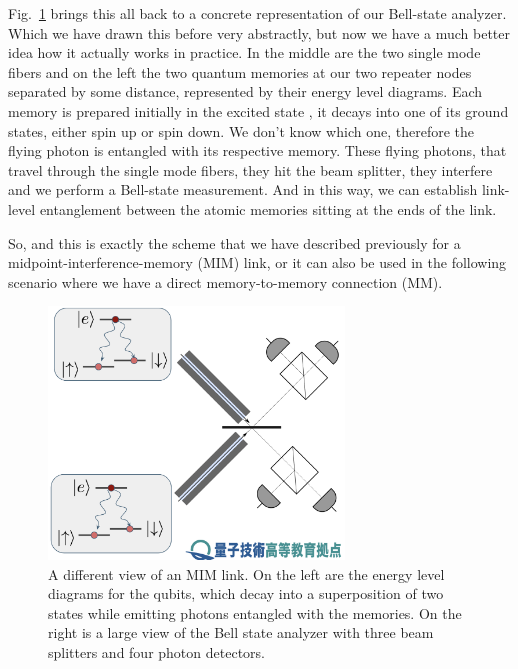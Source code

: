 Fig.~\ref{fig:13-MIM-energy} brings this all back to a concrete representation of our Bell-state analyzer. Which we have drawn this before very abstractly, but now we have a much better idea how it actually works in practice. In the middle are the two single mode fibers and on the left the two quantum memories at our two repeater nodes separated by some distance, represented by their energy level diagrams. Each memory is prepared initially in the excited state , it decays into one of its ground states, either spin up or spin down. We don't know which one, therefore the flying photon is entangled with its respective memory. These flying photons, that travel through the single mode fibers, they hit the beam splitter, they interfere and we perform a Bell-state measurement. And in this way, we can establish link-level entanglement between the atomic memories sitting at the ends of the link.

So, and this is exactly the scheme that we have described previously for a midpoint-interference-memory (MIM) link, or it can also be used in the following scenario where we have a direct memory-to-memory connection (MM).

\begin{figure}[t]
    \centering
    \includegraphics[width=0.7\textwidth]{lesson13/MIM-with-energy-levels.png}
    \caption[MIM with energy levels]{A different view of an MIM link. On the left are the energy level diagrams for the qubits, which decay into a superposition of two states while emitting photons entangled with the memories. On the right is a large view of the Bell state analyzer with three beam splitters and four photon detectors.}
    \label{fig:13-MIM-energy}
\end{figure}




